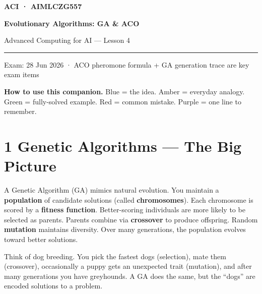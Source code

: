 \documentclass[a4paper,11pt]{article}
\begin{document}
\begin{tcolorbox}[enhanced,colback=NavyBanner,colframe=NavyBanner,arc=0pt,
  boxrule=0pt,left=10mm,right=10mm,top=8mm,bottom=8mm]
  {\small\bfseries\sffamily\color{white}\MakeUppercase{ACI · AIMLCZG557}}\par\vspace{4pt}
  {\LARGE\bfseries\sffamily\color{white}Evolutionary Algorithms: GA \& ACO}\par\vspace{4pt}
  {\normalsize\color{white!80!NavyBanner}Advanced Computing for AI — Lesson 4}\par
  \textcolor{white!40!NavyBanner}{\rule{\linewidth}{0.4pt}}\par\vspace{2pt}
  {\small\color{white!70!NavyBanner}Exam: 28 Jun 2026 · ACO pheromone formula + GA generation trace are key exam items}
\end{tcolorbox}

\vspace{4pt}
{\small\textbf{How to use this companion.} \textcolor{IntFrame}{Blue} = the idea. \textcolor{EveFrame}{Amber} = everyday analogy. \textcolor{WrkFrame}{Green} = fully-solved example. \textcolor{WatFrame}{Red} = common mistake. \textcolor{KeyFrame}{Purple} = one line to remember.}

\vspace{8pt}

\section{1 \quad Genetic Algorithms — The Big Picture}

A Genetic Algorithm (GA) mimics natural evolution. You maintain a \textbf{population} of candidate solutions (called \textbf{chromosomes}). Each chromosome is scored by a \textbf{fitness function}. Better-scoring individuals are more likely to be selected as parents. Parents combine via \textbf{crossover} to produce offspring. Random \textbf{mutation} maintains diversity. Over many generations, the population evolves toward better solutions.

\begin{everyday}
Think of dog breeding. You pick the fastest dogs (selection), mate them (crossover), occasionally a puppy gets an unexpected trait (mutation), and after many generations you have greyhounds. A GA does the same, but the ``dogs'' are encoded solutions to a problem.
\end{everyday}
\end{document}
